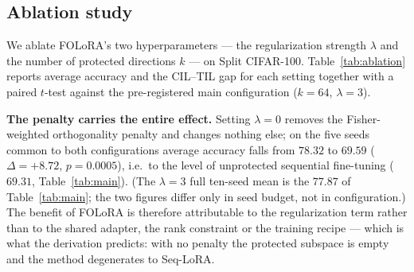 \subsection{Ablation study}
\label{sec:ablation}

We ablate FOLoRA's two hyperparameters --- the regularization strength $\lambda$ and the
number of protected directions $k$ --- on Split CIFAR-100. Table~\ref{tab:ablation}
reports average accuracy and the CIL--TIL gap for each setting together with a paired $t$-test
against the pre-registered main configuration ($k{=}64$, $\lambda{=}3$).



%
\textbf{The penalty carries the entire effect.} Setting $\lambda=0$ removes the
Fisher-weighted orthogonality penalty and changes nothing else; on the five seeds common to
both configurations average accuracy falls from $78.32$ to $69.59$ ($\Delta=+8.72$,
$p=0.0005$), i.e.\ to the level of unprotected sequential fine-tuning ($69.31$,
Table~\ref{tab:main}). (The $\lambda{=}3$ full ten-seed mean is the $77.87$ of
Table~\ref{tab:main}; the two figures differ only in seed budget, not in configuration.)
The benefit of FOLoRA is therefore
attributable to the regularization term rather than to the shared adapter, the rank
constraint or the training recipe --- which is what the derivation predicts: with no
penalty the protected subspace is empty and the method degenerates to Seq-LoRA.


